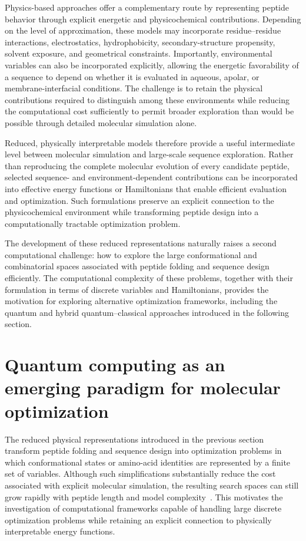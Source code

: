 Physics-based approaches offer a complementary route by representing peptide behavior through explicit energetic and physicochemical contributions. Depending on the level of approximation, these models may incorporate residue--residue interactions, electrostatics, hydrophobicity, secondary-structure propensity, solvent exposure, and geometrical constraints. Importantly, environmental variables can also be incorporated explicitly, allowing the energetic favorability of a sequence to depend on whether it is evaluated in aqueous, apolar, or membrane-interfacial conditions. The challenge is to retain the physical contributions required to distinguish among these environments while reducing the computational cost sufficiently to permit broader exploration than would be possible through detailed molecular simulation alone.

Reduced, physically interpretable models therefore provide a useful intermediate level between molecular simulation and large-scale sequence exploration. Rather than reproducing the complete molecular evolution of every candidate peptide, selected sequence- and environment-dependent contributions can be incorporated into effective energy functions or Hamiltonians that enable efficient evaluation and optimization. Such formulations preserve an explicit connection to the physicochemical environment while transforming peptide design into a computationally tractable optimization problem.

The development of these reduced representations naturally raises a second computational challenge: how to explore the large conformational and combinatorial spaces associated with peptide folding and sequence design efficiently. The computational complexity of these problems, together with their formulation in terms of discrete variables and Hamiltonians, provides the motivation for exploring alternative optimization frameworks, including the quantum and hybrid quantum--classical approaches introduced in the following section.


\section{Quantum computing as an emerging paradigm for molecular optimization}\label{QC_intro}

The reduced physical representations introduced in the previous section transform peptide folding and sequence design into optimization problems in which conformational states or amino-acid identities are represented by a finite set of variables. Although such simplifications substantially reduce the cost associated with explicit molecular simulation, the resulting search spaces can still grow rapidly with peptide length and model complexity~\cite{SUN2026102685}. This motivates the investigation of computational frameworks capable of handling large discrete optimization problems while retaining an explicit connection to physically interpretable energy functions.

